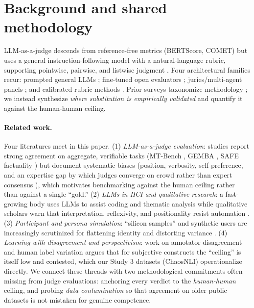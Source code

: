 \section{Background and shared methodology}
LLM-as-a-judge descends from reference-free metrics (BERTScore, COMET) but uses a general instruction-following
model with a natural-language rubric, supporting pointwise, pairwise, and listwise judgment
\citep{li2024compsurvey,gu2024survey}. Four architectural families recur: prompted general LLMs
\citep{zheng2023mtbench,liu2023geval}; fine-tuned open evaluators \citep{kim2023prometheus,zhu2023judgelm,
wang2023pandalm}; juries/multi-agent panels \citep{verga2024poll,chan2023chateval}; and calibrated rubric methods
\citep{hashemi2024llmrubric}. Prior surveys taxonomize methodology \citep{gu2024survey,li2024gen2judge}; we instead
synthesize \emph{where substitution is empirically validated} and quantify it against the human-human ceiling.

\paragraph{Related work.} Four literatures meet in this paper. (1) \emph{LLM-as-a-judge evaluation}: studies report
strong agreement on aggregate, verifiable tasks (MT-Bench \citep{zheng2023mtbench}, GEMBA \citep{kocmi2023gembamqm},
SAFE factuality \citep{wei2024safe}) but document systematic biases (position, verbosity, self-preference, and an
expertise gap by which judges converge on crowd rather than expert consensus \citep{bavaresco2024judgebench}), which
motivates benchmarking against the human ceiling rather than against a single ``gold.'' (2) \emph{LLMs in HCI and
qualitative research}: a fast-growing body uses LLMs to assist coding and thematic analysis
\citep{xiao2023support,gao2024collabcoder,dai2023llminloop} while qualitative scholars warn that interpretation,
reflexivity, and positionality resist automation \citep{schroeder2025usestensions,davison2024ethics}. (3)
\emph{Participant and persona simulation}: ``silicon samples'' \citep{argyle2023outofone} and synthetic users are
increasingly scrutinized for flattening identity and distorting variance
\citep{wang2024flatten,cheng2023compost,bisbee2023perils}. (4) \emph{Learning with disagreement and perspectivism}:
work on annotator disagreement and human label variation \citep{calderon2025alttest} argues that for subjective
constructs the ``ceiling'' is itself low and contested, which our Study 3 datasets (ChaosNLI)
operationalize directly. We connect these threads with two methodological commitments often missing from
judge evaluations: anchoring every verdict to the \emph{human-human} ceiling, and probing \emph{data contamination}
so that agreement on older public datasets is not mistaken for genuine competence.

